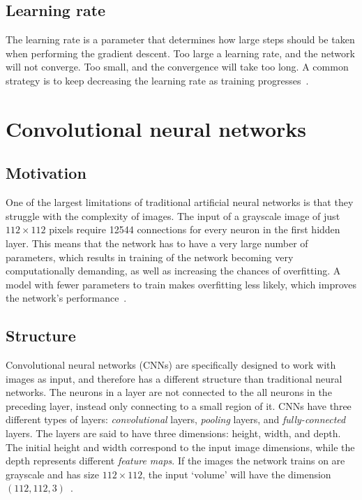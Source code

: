 \documentclass{kththesis}
\newcommand{\num}[1]{{#1}}
\begin{document}
\subsection{Learning rate}
The learning rate is a parameter that determines how large steps should be taken when performing the gradient descent. Too large a learning rate, and the network will not converge. Too small, and the convergence will take too long. A common strategy is to keep decreasing the learning rate as training progresses~\cite{Bottou2012}.

\section{Convolutional neural networks}

\subsection{Motivation}
One of the largest limitations of traditional artificial neural networks is that they struggle with the complexity of images. The input of a grayscale image of just $112 \times 112$ pixels require \num{12544} connections for every neuron in the first hidden layer. This means that the network has to have a very large number of parameters, which results in training of the network becoming very computationally demanding, as well as increasing the chances of overfitting. A model with fewer parameters to train makes overfitting less likely, which improves the network's performance~\cite{cnnIntro}.

\subsection{Structure}
Convolutional neural networks (CNNs) are specifically designed to work with images as input, and therefore has a different structure than traditional neural networks.
The neurons in a layer are not connected to the all neurons in the preceding layer, instead only connecting to a small region of it.
CNNs have three different types of layers: \textit{convolutional} layers, \textit{pooling} layers, and \textit{fully-connected} layers.
The layers are said to have three dimensions: height, width, and depth. The initial height and width correspond to the input image dimensions, while the depth represents different \textit{feature maps}.
If the images the network trains on are grayscale and has size $112 \times 112$, the input `volume' will have the dimension $(112, 112, 3)$~\cite{cnnIntro}.
\end{document}
